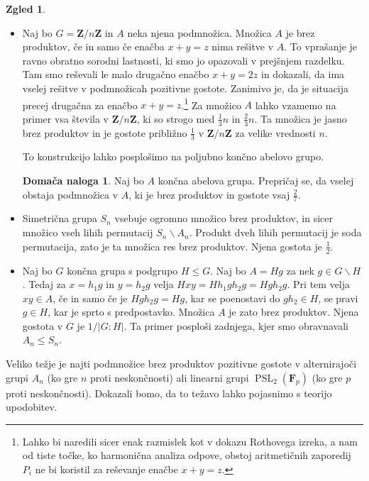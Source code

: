 \documentclass[11pt]{book}
\def\ZZ{\mathbf{Z}}
\def\FF{\mathbf{F}}
\DeclareMathOperator\PSL{PSL}
\theoremstyle{definition}
\theoremstyle{zgled}
\newtheorem{zgled}[theorem]{Zgled}
\theoremstyle{zgledbrezstevilke}
\theoremstyle{odprtproblem}
\theoremstyle{domacanaloga}
\newtheorem{domacanaloga}[theorem]{Domača naloga}
\theoremstyle{izrek}
\begin{document}
\begin{zgled} \leavevmode
\begin{itemize}
\item Naj bo $G = \ZZ/n\ZZ$ in $A$ neka njena podmnožica. Množica $A$ je brez produktov, če in samo če enačba $x+y=z$ nima rešitve v $A$. To vprašanje je ravno obratno sorodni lastnosti, ki smo jo opazovali v prejšnjem razdelku. Tam smo reševali le malo drugačno enačbo $x+y=2z$ in dokazali, da ima vselej rešitve v podmnožicah pozitivne gostote. Zanimivo je, da je situacija precej drugačna za enačbo $x+y = z$.\footnote{Lahko bi naredili sicer enak razmislek kot v dokazu Rothovega izreka, a nam od tiste točke, ko harmonična analiza odpove, obstoj aritmetičnih zaporedij $P_i$ ne bi koristil za reševanje enačbe $x+y=z$.} Za množico $A$ lahko vzamemo na primer vsa števila v $\ZZ/n\ZZ$, ki so strogo med $\frac{1}{3}n$ in $\frac{2}{3}n$. Ta množica je jasno brez produktov in je gostote približno $\frac{1}{3}$ v $\ZZ/n\ZZ$ za velike vrednosti $n$. 

To konstrukcijo lahko posplošimo na poljubno končno abelovo grupo. 

\begin{domacanaloga}
Naj bo $A$ končna abelova grupa. Prepričaj se, da vselej obstaja podmnožica v $A$, ki je brez produktov in gostote vsaj $\frac{2}{7}$.
\end{domacanaloga}

\item Simetrična grupa $S_n$ vsebuje ogromno množico brez produktov, in sicer množico vseh lihih permutacij $S_n \backslash A_n$. Produkt dveh lihih permutacij je soda permutacija, zato je ta množica res brez produktov. Njena gostota je $\frac12$.

\item Naj bo $G$ končna grupa s podgrupo $H \leq G$. Naj bo $A = Hg$ za nek $g \in G \backslash H$. Tedaj za $x = h_1 g$ in $y = h_2 g$ velja $Hxy = Hh_1 g h_2 g = H g h_2 g$. Pri tem velja $xy \in A$, če in samo če je $H g h_2 g = Hg$, kar se poenostavi do $g h_2 \in H$, se pravi $g \in H$, kar je sprto s predpostavko. Množica $A$ je zato brez produktov. Njena gostota v $G$ je $1/|G:H|$. Ta primer posploši zadnjega, kjer smo obravnavali $A_n \leq S_n$.
\end{itemize}
\end{zgled}

Veliko težje je najti podmnožice brez produktov pozitivne gostote v alternirajoči grupi $A_n$ (ko gre $n$ proti neskončnosti) ali linearni grupi $\PSL_2(\FF_p)$ (ko gre $p$ proti neskončnosti). Dokazali bomo, da to težavo lahko pojasnimo s teorijo upodobitev.
\end{document}
